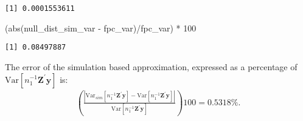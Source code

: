 \documentclass[
  12pt,
  leqno]{article}
\newenvironment{Shaded}{\begin{snugshade}}{\end{snugshade}}
\newcommand{\AttributeTok}[1]{\textcolor[rgb]{0.77,0.63,0.00}{#1}}
\newcommand{\ControlFlowTok}[1]{\textcolor[rgb]{0.13,0.29,0.53}{\textbf{#1}}}
\newcommand{\DecValTok}[1]{\textcolor[rgb]{0.00,0.00,0.81}{#1}}
\newcommand{\FunctionTok}[1]{\textcolor[rgb]{0.00,0.00,0.00}{#1}}
\newcommand{\NormalTok}[1]{#1}
\newcommand{\OtherTok}[1]{\textcolor[rgb]{0.56,0.35,0.01}{#1}}
\newcommand{\SpecialCharTok}[1]{\textcolor[rgb]{0.00,0.00,0.00}{#1}}
\DeclareMathOperator{\1}{\mathbbm{1}}
\begin{document}
\begin{Shaded}
\end{Shaded}

\begin{verbatim}
[1] 0.0001553611
\end{verbatim}

\begin{Shaded}
\begin{Highlighting}[]
\NormalTok{(}\FunctionTok{abs}\NormalTok{(null\_dist\_sim\_var }\SpecialCharTok{{-}}\NormalTok{ fpc\_var)}\SpecialCharTok{/}\NormalTok{fpc\_var) }\SpecialCharTok{*} \DecValTok{100}
\end{Highlighting}
\end{Shaded}

\begin{verbatim}
[1] 0.08497887
\end{verbatim}

\normalsize

The error of the simulation based approximation, expressed as a
percentage of
\(\mathrm{Var}\left[n_1^{-1} \mathbf{Z}^{\prime} \mathbf{y}\right]\) is:
\begin{align*}
\left(\frac{\left|\mathrm{Var}_{sim}\left[n_1^{-1} \mathbf{Z}^{\prime} \mathbf{y}\right] - \mathrm{Var}\left[n_1^{-1} \mathbf{Z}^{\prime} \mathbf{y}\right]\right|}{\mathrm{Var}\left[n_1^{-1} \mathbf{Z}^{\prime} \mathbf{y}\right]}\right) 100 = 0.5318 \%.
\end{align*}
\end{document}
